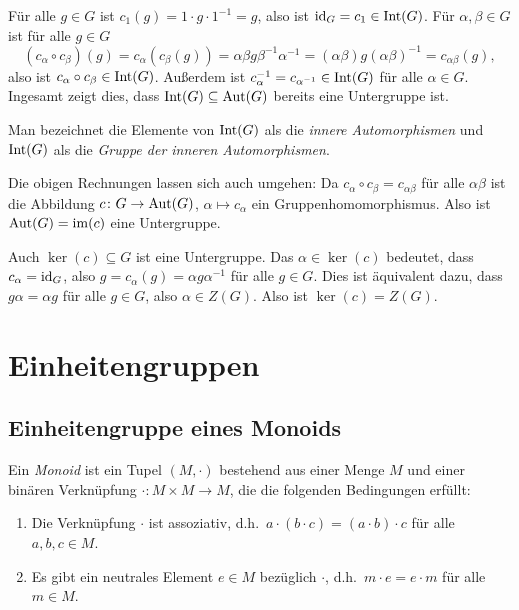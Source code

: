 Für alle $g \in G$ ist $c_1(g) = 1 \cdot g \cdot 1^{-1} = g$, also ist $\mathrm{id}_G = c_1 \in \mathrm{Int}(G)$. Für $\alpha, \beta \in G$ ist für alle $g \in G$
\[
 (c_\alpha \circ c_\beta)(g)
 = c_\alpha( c_\beta(g) )
 = \alpha \beta g \beta^{-1} \alpha^{-1}
 = (\alpha \beta) g (\alpha \beta)^{-1}
 = c_{\alpha \beta}(g),
\]
also ist $c_\alpha \circ c_\beta \in \mathrm{Int}(G)$. Außerdem ist $c_\alpha^{-1} = c_{\alpha^{-1}} \in \mathrm{Int}(G)$ für alle $\alpha \in G$. Ingesamt zeigt dies, dass $\mathrm{Int}(G) \subseteq \mathrm{Aut}(G)$ bereits eine Untergruppe ist.

Man bezeichnet die Elemente von $\mathrm{Int}(G)$ als die \emph{innere Automorphismen} und $\mathrm{Int}(G)$ als die \emph{Gruppe der inneren Automorphismen}.

\begin{bem}
 Die obigen Rechnungen lassen sich auch umgehen: Da $c_\alpha \circ c_\beta = c_{\alpha \beta}$ für alle $\alpha \beta$ ist die Abbildung $c \colon G \to \mathrm{Aut}(G)$, $\alpha \mapsto c_\alpha$ ein Gruppenhomomorphismus. Also ist $\mathrm{Aut}(G) = \mathrm{im}(c)$ eine Untergruppe.
 
 Auch $\ker(c) \subseteq G$ ist eine Untergruppe. Das $\alpha \in \ker(c)$ bedeutet, dass $c_\alpha = \mathrm{id}_G$, also $g = c_\alpha(g) = \alpha g \alpha^{-1}$ für alle $g \in G$. Dies ist äquivalent dazu, dass $g \alpha = \alpha g$ für alle $g \in G$, also $\alpha \in Z(G)$. Also ist $\ker(c) = Z(G)$.
\end{bem}





\section{Einheitengruppen}


\subsection{Einheitengruppe eines Monoids}
\begin{defi}
 Ein \emph{Monoid} ist ein Tupel $(M, \cdot)$ bestehend aus einer Menge $M$ und einer binären Verknüpfung $\cdot \colon M \times M \to M$, die die folgenden Bedingungen erfüllt:
 \begin{enumerate}[label=\roman*)]
  \item
   Die Verknüpfung $\cdot$ ist assoziativ, d.h.\ $a \cdot (b \cdot c) = (a \cdot b) \cdot c$ für alle $a,b,c \in M$.
  \item
   Es gibt ein neutrales Element $e \in M$ bezüglich $\cdot$, d.h.\ $m \cdot e = e \cdot m$ für alle $m \in M$.
 \end{enumerate}
\end{defi}

